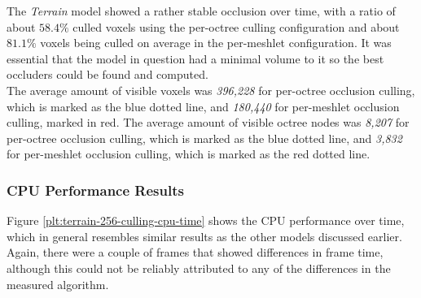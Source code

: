 
\noindent
The \emph{Terrain} model showed a rather stable occlusion over time, with a ratio of about $58.4\%$ culled voxels 
using the per-octree culling configuration and about $81.1\%$ voxels being culled on average in the per-meshlet 
configuration. It was essential that the model in question had a minimal volume to it so the best occluders could 
be found and computed. \\

\noindent
The average amount of visible voxels was \emph{396,228} for per-octree occlusion culling, which is marked as the 
blue dotted line, and \emph{180,440} for per-meshlet occlusion culling, marked in red. The average amount of 
visible octree nodes was \emph{8,207} for per-octree occlusion culling, which is marked as the blue dotted line, 
and \emph{3,832} for per-meshlet occlusion culling, which is marked as the red dotted line.

\subsubsection*{CPU Performance Results} \label{subsubsec-cpu-performance-results-terrain}

Figure \ref{plt:terrain-256-culling-cpu-time} shows the \ac{CPU} performance over time, which in general 
resembles similar results as the other models discussed earlier. Again, there were a couple of frames that 
showed differences in frame time, although this could not be reliably attributed to any of the differences in 
the measured algorithm. 

